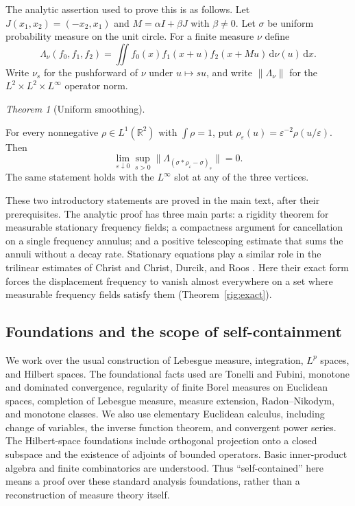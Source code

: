 \documentclass[11pt]{amsart}
\newcommand{\R}{\mathbb R}
\newcommand{\dd}{\,\mathrm d}
\theoremstyle{definition}
\theoremstyle{remark}
\newtheorem{maintheorem}{Theorem}
\numberwithin{equation}{section}
\providecommand{\lean}[1]{}
\providecommand{\leanok}{}
\begin{document}
The analytic assertion used to prove this is as follows.  Let
$J(x_1,x_2)=(-x_2,x_1)$ and $M=\alpha I+\beta J$ with $\beta\ne0$.
Let $\sigma$ be uniform probability measure on the unit circle.  For
a finite measure $\nu$ define
\[
 \Lambda_\nu(f_0,f_1,f_2)
  =\iint f_0(x)f_1(x+u)f_2(x+Mu)\dd\nu(u)\dd x.
\]
Write $\nu_s$ for the pushforward of $\nu$ under $u\mapsto su$,
and write $\|\Lambda_\nu\|$ for the
$L^2\times L^2\times L^\infty$ operator norm.

\begin{maintheorem}[Uniform smoothing]\label{smoothing}
\lean{Auto.smoothing}
\leanok
For every nonnegative $\rho\in L^1(\R^2)$ with $\int\rho=1$, put
$\rho_\varepsilon(u)=\varepsilon^{-2}\rho(u/\varepsilon)$.  Then
\[
 \lim_{\varepsilon\downarrow0}\sup_{s>0}
  \big\|\Lambda_{(\sigma*\rho_\varepsilon-\sigma)_s}\big\|=0.
\]
The same statement holds with the $L^\infty$ slot at any of the
three vertices.
\end{maintheorem}

These two introductory statements are proved in the main text, after
their prerequisites.  The analytic proof has three main parts: a rigidity
theorem for measurable stationary frequency fields; a compactness argument
for cancellation on a single frequency annulus; and a positive
telescoping estimate that sums the annuli without a decay rate.
Stationary equations play a similar role in the trilinear estimates of
Christ \cite{Christ,ChristSub} and Christ, Durcik, and Roos \cite{CDR}.
Here their exact form forces the displacement frequency to vanish almost
everywhere on a set where measurable frequency fields satisfy them
(Theorem~\ref{rig:exact}).

\subsection*{Foundations and the scope of self-containment}

We work over the usual construction of Lebesgue measure, integration,
$L^p$ spaces, and Hilbert spaces.  The foundational facts used are
Tonelli and Fubini, monotone and dominated convergence, regularity of
finite Borel measures on Euclidean spaces, completion of Lebesgue
measure, measure extension, Radon--Nikodym, and monotone classes.
We also use elementary
Euclidean calculus, including change of variables, the inverse function
theorem, and convergent power series.  The Hilbert-space foundations
include orthogonal projection onto a closed subspace and the existence
of adjoints of bounded operators.  Basic inner-product algebra and
finite combinatorics are understood.  Thus ``self-contained'' here means
a proof over these standard analysis foundations, rather than a
reconstruction of measure theory itself.
\end{document}

